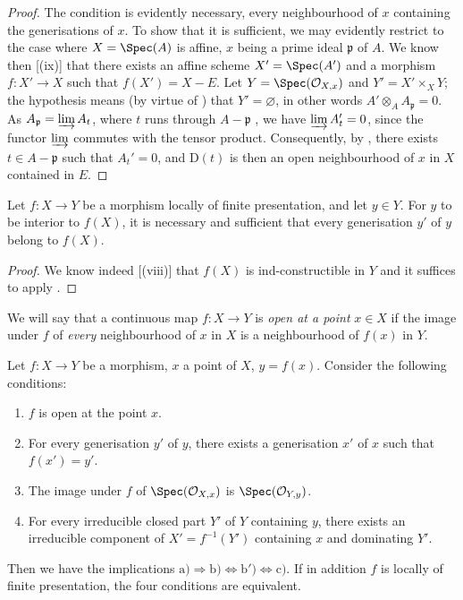 \begin{proof}
The condition is evidently necessary, every neighbourhood of $x$ containing the generisations of $x$.
To show that it is sufficient, we may evidently restrict to the case where $X=\Spec(A)$ is affine, $x$ being a prime ideal $\mathfrak{p}$ of $A$.
We know then [(ix)] that there exists an affine scheme $X'=\Spec(A')$ and a morphism $f:X'\to X$ such that $f(X')=X-E$.
Let $Y=\Spec(\mathcal{O}_{X,x})$ and $Y'=X'\times_X Y$; the hypothesis means (by virtue of ) that $Y'=\varnothing$, in other words $A'\otimes_A A_\mathfrak{p}=0$.
As $A_\mathfrak{p}=\varinjlim A_t$, where $t$ runs through $A-\mathfrak{p}$ , we have $\varinjlim A_t'=0$, since the functor $\varinjlim$ commutes with the tensor product.
Consequently, by , there exists $t\in A-\mathfrak{p}$ such that $A_t'=0$, and $\mathrm{D}(t)$ is then an open neighbourhood of $x$ in $X$ contained in $E$.
\end{proof}

\begin{corollary}[1.10.2]
\label{IV.1.10.2}
Let $f:X\to Y$ be a morphism locally of finite presentation, and let $y\in Y$.
For $y$ to be interior to $f(X)$, it is necessary and sufficient that every generisation $y'$ of $y$ belong to $f(X)$.
\end{corollary}

\begin{proof}
We know indeed [(viii)] that $f(X)$ is ind-constructible in $Y$ and it suffices to apply .
\end{proof}

We will say that a continuous map $f:X\to Y$ is \emph{open at a point} $x\in X$ if the image under $f$ of \emph{every} neighbourhood of $x$ in $X$ is a neighbourhood of $f(x)$ in $Y$.

\begin{proposition}[1.10.3]
\label{IV.1.10.3}
Let $f:X\to Y$ be a morphism, $x$ a point of $X$, $y=f(x)$.
Consider the following conditions:
\begin{enumerate}
  \item[\rm a)] $f$ is open at the point $x$.
  \item[\rm b)] For every generisation $y'$ of $y$, there exists a generisation $x'$ of $x$ such that $f(x')=y'$.
  \item[\rm b$'$)] The image under $f$ of $\Spec(\mathcal{O}_{X,x})$ is $\Spec(\mathcal{O}_{Y,y})$.
  \item[\rm c)] For every irreducible closed part $Y'$ of $Y$ containing $y$, there exists an irreducible component of $X'=f^{-1}(Y')$ containing $x$ and dominating $Y'$.
\end{enumerate}
Then we have the implications $\mathrm{a)}\Rightarrow\mathrm{b)}\Leftrightarrow\mathrm{b')}\Leftrightarrow\mathrm{c)}$.
If in addition $f$ is locally of finite presentation, the four conditions are equivalent.
\end{proposition}


